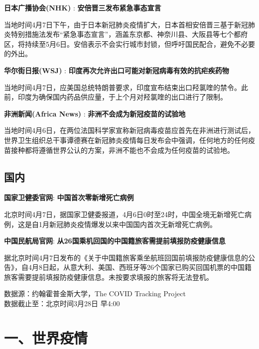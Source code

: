 \documentclass[
]{article}
\begin{document}
\textbf{\textcolor{glaucous}{日本广播协会(NHK)}} :
\textbf{安倍晋三发布紧急事态宣言}

当地时间4月7日下午，由于日本新冠肺炎疫情扩大，日本首相安倍晋三基于新冠肺炎特别措施法发布``紧急事态宣言''，涵盖东京都、神奈川县、大阪县等七个都府区，将持续至5月6日。安倍表示不会实行城市封锁，但呼吁国民配合，避免不必要的外出。

\textbf{\textcolor{glaucous}{华尔街日报(WSJ)}} :
\textbf{印度再次允许出口可能对新冠病毒有效的抗疟疾药物}

当地时间4月7日，应美国总统特朗普要求，印度宣布结束出口羟氯喹的禁令。此前，印度为确保国内药品供应量，于上个月对羟氯喹的出口进行了限制。

\textbf{\textcolor{glaucous}{非洲新闻(Africa News)}} :
\textbf{非洲不会成为新冠疫苗的试验地}

当地时间4月6日，在两位法国科学家宣称新冠病毒疫苗应首先在非洲进行测试后，世界卫生组织总干事谭德赛在新冠肺炎疫情每日发布会中强调，任何地方的任何疫苗接种都将遵循世界公认的方案，非洲不能也不会成为任何疫苗的试验地。

\hypertarget{section-1}{%
\subsection{\texorpdfstring{\textcolor{glaucous}{\Huge 国内}}{}}\label{section-1}}

\textbf{\textcolor{glaucous}{国家卫健委官网}}:
\textbf{中国首次零新增死亡病例}

北京时间4月7日，据国家卫健委报道，4月6日0时至24时，中国全境无新增死亡病例，这是自1月新冠肺炎疫情爆发以来中国国内首次无新增死亡病例。

\textbf{\textcolor{glaucous}{中国民航局官网}}:
\textbf{从26国乘机回国的中国籍旅客需提前填报防疫健康信息}

据北京时间4月7日发布的《关于中国籍旅客乘坐航班回国前填报防疫健康信息的公告》，自4月8日起，从意大利、美国、西班牙等26个国家已购买回国机票的中国籍旅客需要提前填报防疫健康信息。未按要求填报的旅客将无法登机。

%
  \noindent{}%

\begin{Large}
{数据源：约翰霍普金斯大学，The COVID Tracking Project \\ 数据截止至：北京时间3月28日 早4:00}
\end{Large}

\hypertarget{section-2}{%
\section{\texorpdfstring{\textcolor{glaucous}{\Huge 一、世界疫情}}{}}\label{section-2}}
\end{document}
